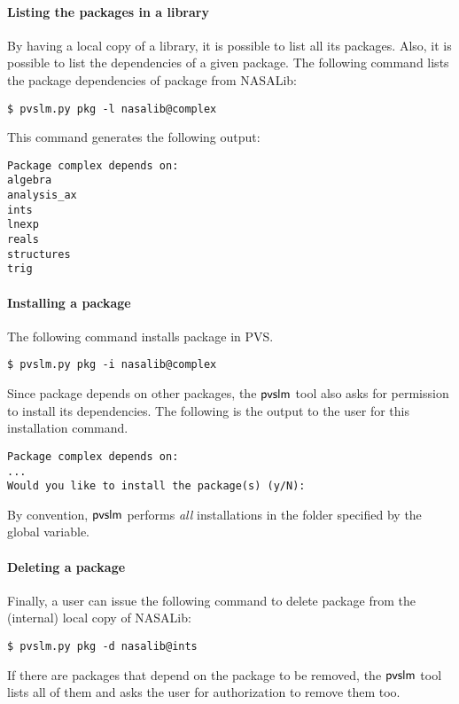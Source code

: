 \paragraph{Listing the packages in a library} By having a local
copy of a library, it is possible to list all its packages. Also, it
is possible to list the dependencies of a given package. The following
command lists the package dependencies of package  from
NASALib:
%
\begin{verbatim}
$ pvslm.py pkg -l nasalib@complex
\end{verbatim}
%
This command generates the following output:
%
\begin{verbatim}
Package complex depends on:
algebra
analysis_ax
ints
lnexp
reals
structures
trig
\end{verbatim}

\paragraph{Installing a package} The following command installs package
 in PVS.
%
\begin{verbatim}
$ pvslm.py pkg -i nasalib@complex
\end{verbatim}
%
Since package  depends on other packages, the $\textsf{pvslm}$
tool also asks for permission to install its dependencies. The
following is the output to the user for this installation command.
%
\begin{lstlisting}
Package complex depends on:
...
Would you like to install the package(s) (y/N): 
\end{lstlisting}
%
By convention, $\textsf{pvslm}$ performs {\em all} installations in the folder
specified by the  global variable.

\paragraph{Deleting a package} Finally, a user can issue the following
command to delete package  from the (internal) local copy of
NASALib:
%
\begin{verbatim}
$ pvslm.py pkg -d nasalib@ints
\end{verbatim}
%
If there are packages that depend on the package to be removed, the $\textsf{pvslm}$ tool
lists all of them and asks the user for authorization to remove them
too.
